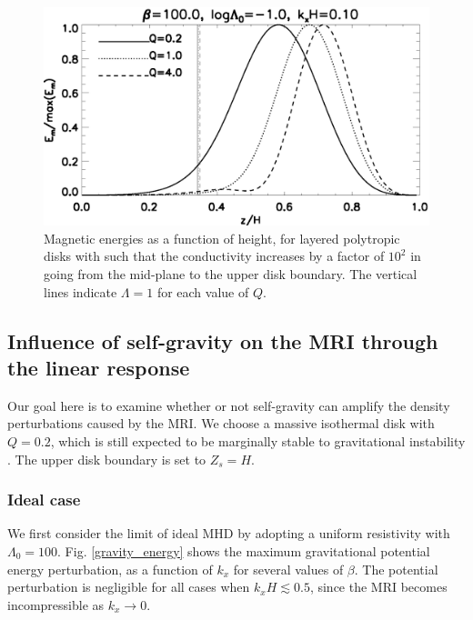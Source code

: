 \begin{figure}
  \includegraphics[width=\linewidth]{figures/compare_results_poly_layer_amp100}
  \caption{Magnetic energies as a function of height, for layered polytropic disks with
    such that the conductivity increases by a 
    factor of $10^2$ in going from the mid-plane to the upper disk
    boundary. The vertical lines indicate $\Lambda=1$ for each value
    of $Q$.
    \label{poly_layer}}
\end{figure}


\subsection{Influence of self-gravity on the MRI through the linear
  response}  
Our goal here is to examine whether or not self-gravity can amplify
the density perturbations caused by the MRI. We choose a massive 
isothermal disk with $Q=0.2$, which is still expected to be marginally
stable to gravitational instability \citep[][who find
a critical value of  $Q\simeq 0.2$]{mamat10}.   
The upper disk boundary is set to $Z_s=H$. 


\subsubsection{Ideal case}
We first consider the limit of ideal MHD by adopting a uniform
resistivity with $\Lambda_0=100$. %
Fig. \ref{gravity_energy} shows the maximum gravitational potential
energy perturbation, as a function of $k_x$ for several values of
$\beta$. The potential perturbation is negligible for all cases when 
$k_xH\lesssim 0.5$, since the MRI becomes incompressible as $k_x\to
0$. 


